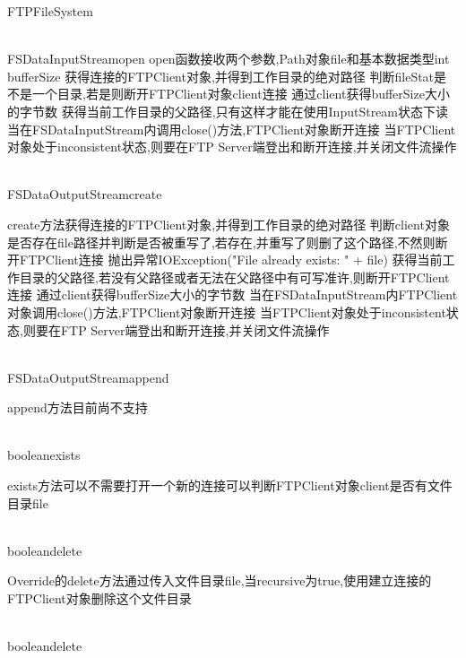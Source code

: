 \begin{XeClass}{FTPFileSystem}
\begin{XeMethod}{\XePublic\\ }{FSDataInputStream}{open}
 open函数接收两个参数,Path对象file和基本数据类型int bufferSize
 获得连接的FTPClient对象,并得到工作目录的绝对路径
 判断fileStat是不是一个目录,若是则断开FTPClient对象client连接
 通过client获得bufferSize大小的字节数
 获得当前工作目录的父路径,只有这样才能在使用InputStream状态下读
 当在FSDataInputStream内调用close()方法,FTPClient对象断开连接
 当FTPClient对象处于inconsistent状态,则要在FTP Server端登出和断开连接,并关闭文件流操作

  \end{XeMethod}

  \begin{XeMethod}{\XePublic\\ }{FSDataOutputStream}{create}
       
 create方法获得连接的FTPClient对象,并得到工作目录的绝对路径
 判断client对象是否存在file路径并判断是否被重写了,若存在,并重写了则删了这个路径,不然则断开FTPClient连接
 抛出异常IOException("File already exists: " + file)
 获得当前工作目录的父路径,若没有父路径或者无法在父路径中有可写准许,则断开FTPClient连接
 通过client获得bufferSize大小的字节数
 当在FSDataInputStream内FTPClient对象调用close()方法,FTPClient对象断开连接
 当FTPClient对象处于inconsistent状态,则要在FTP Server端登出和断开连接,并关闭文件流操作

  \end{XeMethod}

  \begin{XeMethod}{\XePublic\\ }{FSDataOutputStream}{append}
       
 append方法目前尚不支持 

  \end{XeMethod}

  \begin{XeMethod}{\XePrivate\\ }{boolean}{exists}
       
 exists方法可以不需要打开一个新的连接可以判断FTPClient对象client是否有文件目录file

  \end{XeMethod}

  \begin{XeMethod}{\XePublic\\ }{boolean}{delete}
       
 Override的delete方法通过传入文件目录file,当recursive为true,使用建立连接的FTPClient对象删除这个文件目录

  \end{XeMethod}

  \begin{XeMethod}{\XePrivate\\ }{boolean}{delete}
       

\end{XeMethod}
\end{XeClass}
